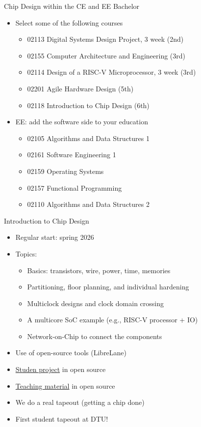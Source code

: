 \begin{frame}[fragile]{Chip Design within the CE and EE Bachelor}
\begin{itemize}
\item Select some of the following courses
\begin{itemize}
\item 02113 Digital Systems Design Project, 3 week (2nd)
\item 02155 Computer Architecture and Engineering (3rd)
\item 02114 Design of a RISC-V Microprocessor, 3 week (3rd)
\item 02201 Agile Hardware Design (5th)
\item 02118 Introduction to Chip Design (6th)
\end{itemize}
\item EE: add the software side to your education
\begin{itemize}
\item 02105 Algorithms and Data Structures 1
\item 02161 Software Engineering 1
\item 02159 Operating Systems
\item 02157 Functional Programming
\item 02110 Algorithms and Data Structures 2
\end{itemize}
\end{itemize}
\end{frame}

\begin{frame}[fragile]{Introduction to Chip Design}
\begin{itemize}
\item Regular start: spring 2026
\item Topics:
\begin{itemize}
\item Basics: transistors, wire, power, time, memories
\item Partitioning, floor planning, and individual hardening
\item Multiclock designs and clock domain crossing
\item A multicore SoC example (e.g., RISC-V processor + IO)
\item Network-on-Chip to connect the components
\end{itemize}
\item Use of open-source tools (LibreLane)
\item \href{https://github.com/os-chip-design/dtu-soc-2026}{Studen project}  in open source
\item \href{https://github.com/os-chip-design/chip-design-intro}{Teaching material} in open source
\item We do a real tapeout (getting a chip done)
\item First student tapeout at DTU!
\end{itemize}
\end{frame}

